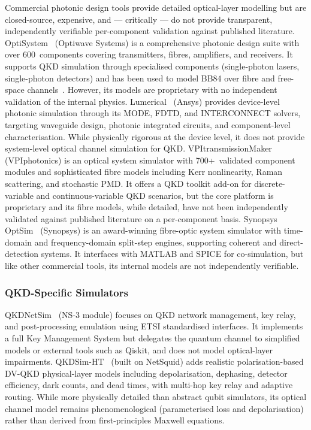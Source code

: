 \documentclass[11pt,a4paper]{article}
\begin{document}
Commercial photonic design tools provide detailed optical-layer modelling
but are closed-source, expensive, and --- critically --- do not provide
transparent, independently verifiable per-component validation against
published literature.  OptiSystem~\cite{optisystem}
(Optiwave Systems) is a comprehensive photonic design suite with over
600~components covering transmitters, fibres, amplifiers, and receivers.
It supports QKD simulation through specialised components (single-photon
lasers, single-photon detectors) and has been used to model BB84
over fibre and free-space channels~\cite{buhari2012}.  However, its
models are proprietary with no independent validation of the internal
physics.
Lumerical~\cite{lumerical} (Ansys) provides device-level photonic
simulation through its MODE, FDTD, and INTERCONNECT solvers, targeting
waveguide design, photonic integrated circuits, and component-level
characterisation.  While physically rigorous at the device level, it
does not provide system-level optical channel simulation for QKD.
VPItransmissionMaker~\cite{vpiphotonics} (VPIphotonics) is an optical
system simulator with 700+~validated component modules and sophisticated
fibre models including Kerr nonlinearity, Raman scattering, and
stochastic PMD.  It offers a QKD toolkit add-on for discrete-variable
and continuous-variable QKD scenarios, but the core platform is
proprietary and its fibre models, while detailed, have not been
independently validated against published literature on a per-component
basis.  Synopsys OptSim~\cite{optsim} (Synopsys) is an award-winning
fibre-optic system simulator with time-domain and frequency-domain
split-step engines, supporting coherent and direct-detection systems.
It interfaces with MATLAB and SPICE for co-simulation, but like other
commercial tools, its internal models are not independently verifiable.

\subsubsection{QKD-Specific Simulators}\label{sec:qkd-sim}

QKDNetSim~\cite{qkdnetsim} (NS-3 module) focuses on QKD network
management, key relay, and post-processing emulation using ETSI
standardised interfaces.  It implements a full Key Management System
but delegates the quantum channel to simplified models or external
tools such as Qiskit, and does not model optical-layer impairments.
QKDSim-HT~\cite{qkdsimht} (built on NetSquid) adds realistic
polarisation-based DV-QKD physical-layer models including
depolarisation, dephasing, detector efficiency, dark counts, and
dead times, with multi-hop key relay and adaptive routing.  While
more physically detailed than abstract qubit simulators, its optical
channel model remains phenomenological (parameterised loss and
depolarisation) rather than derived from first-principles Maxwell
equations.
\end{document}
